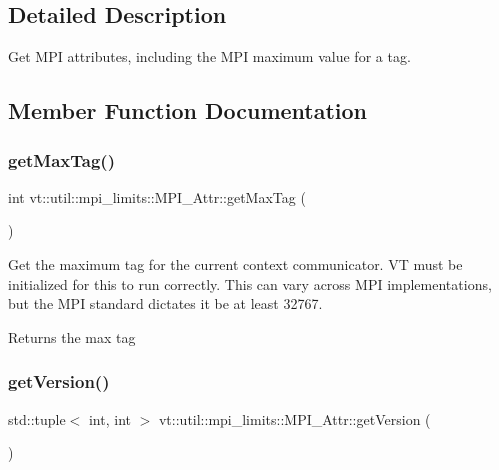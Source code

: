\subsection{Detailed Description}
Get M\+PI attributes, including the M\+PI maximum value for a tag. 

\subsection{Member Function Documentation}
\mbox{\label{structvt_1_1util_1_1mpi__limits_1_1_m_p_i___attr_a3150f6a09a10554293f176074072ac2d}} 
\subsubsection{\texorpdfstring{get\+Max\+Tag()}{getMaxTag()}}
{\footnotesize\ttfamily int vt\+::util\+::mpi\+\_\+limits\+::\+M\+P\+I\+\_\+\+Attr\+::get\+Max\+Tag (\begin{DoxyParamCaption}{ }\end{DoxyParamCaption})\hspace{0.3cm}{\ttfamily [static]}}



Get the maximum tag for the current context communicator. VT must be initialized for this to run correctly. This can vary across M\+PI implementations, but the M\+PI standard dictates it be at least 32767. 

\begin{DoxyReturn}{Returns}
the max tag 
\end{DoxyReturn}
\mbox{\label{structvt_1_1util_1_1mpi__limits_1_1_m_p_i___attr_ae56b450a99da5c631b22e8f84d5f3c25}} 
\subsubsection{\texorpdfstring{get\+Version()}{getVersion()}}
{\footnotesize\ttfamily std\+::tuple$<$ int, int $>$ vt\+::util\+::mpi\+\_\+limits\+::\+M\+P\+I\+\_\+\+Attr\+::get\+Version (\begin{DoxyParamCaption}{ }\end{DoxyParamCaption})\hspace{0.3cm}{\ttfamily [static]}}



